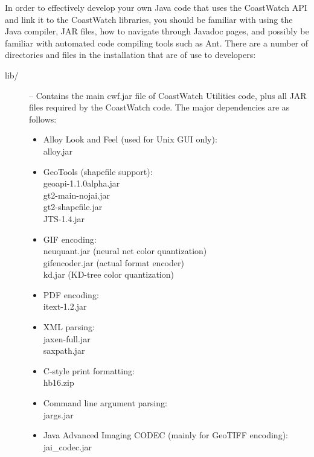 In order to effectively develop your own Java code that uses the
CoastWatch API and link it to the CoastWatch libraries, you
should be familiar with using the Java compiler, JAR files, how
to navigate through Javadoc pages, and possibly be familiar with
automated code compiling tools such as Ant.  There are a number
of directories and files in the installation that are of use to
developers:
\begin{description}

\item[{\file lib/}] -- Contains the main {\file cwf.jar} file of
CoastWatch Utilities code, plus all JAR files required by the
CoastWatch code.  The major dependencies are as follows:
\begin{itemize}

\item Alloy Look and Feel (used for Unix GUI only):\\
{\file alloy.jar}

\item GeoTools (shapefile support):\\
{\file geoapi-1.1.0alpha.jar}\\
{\file gt2-main-nojai.jar}\\
{\file gt2-shapefile.jar}\\
{\file JTS-1.4.jar}

\item GIF encoding: \\
{\file neuquant.jar} (neural net color quantization) \\
{\file gifencoder.jar} (actual format encoder) \\
{\file kd.jar} (KD-tree color quantization)

\item PDF encoding: \\
{\file itext-1.2.jar}

\item XML parsing: \\
{\file jaxen-full.jar} \\
{\file saxpath.jar}

\item C-style print formatting:\\
{\file hb16.zip}

\item Command line argument parsing:\\
{\file jargs.jar}

\item Java Advanced Imaging CODEC (mainly for GeoTIFF encoding):\\
{\file jai\_codec.jar}


\end{itemize}
\end{description}

